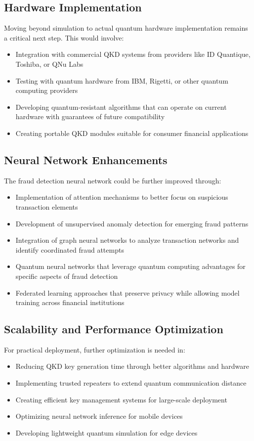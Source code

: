 \documentclass[onecolumn,a4paper,10pt]{IEEEtran}
\begin{document}
\subsection{Hardware Implementation}
Moving beyond simulation to actual quantum hardware implementation remains a critical next step. This would involve:
\begin{itemize}
    \item Integration with commercial QKD systems from providers like ID Quantique, Toshiba, or QNu Labs
    \item Testing with quantum hardware from IBM, Rigetti, or other quantum computing providers 
    \item Developing quantum-resistant algorithms that can operate on current hardware with guarantees of future compatibility
    \item Creating portable QKD modules suitable for consumer financial applications
\end{itemize}

\subsection{Neural Network Enhancements}
The fraud detection neural network could be further improved through:
\begin{itemize}
    \item Implementation of attention mechanisms to better focus on suspicious transaction elements
    \item Development of unsupervised anomaly detection for emerging fraud patterns
    \item Integration of graph neural networks to analyze transaction networks and identify coordinated fraud attempts
    \item Quantum neural networks that leverage quantum computing advantages for specific aspects of fraud detection
    \item Federated learning approaches that preserve privacy while allowing model training across financial institutions
\end{itemize}

\subsection{Scalability and Performance Optimization}
For practical deployment, further optimization is needed in:
\begin{itemize}
    \item Reducing QKD key generation time through better algorithms and hardware
    \item Implementing trusted repeaters to extend quantum communication distance
    \item Creating efficient key management systems for large-scale deployment
    \item Optimizing neural network inference for mobile devices
    \item Developing lightweight quantum simulation for edge devices
\end{itemize}
\end{document}
